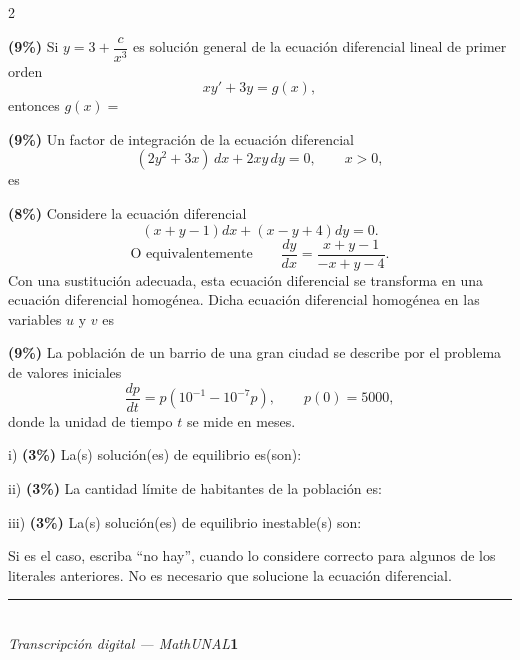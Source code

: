 \documentclass[11pt]{article}
\begin{document}
\begin{multicols}{2}

\begin{opciones}
\item[(a)] \textbf{(9\%)} Si $y=3+\dfrac{c}{x^3}$ es solución general de la ecuación diferencial lineal de primer orden
\[
xy'+3y=g(x),
\]
entonces $g(x)=$ \underline{\hspace{3cm}}

\item[(b)] \textbf{(9\%)} Un factor de integración de la ecuación diferencial
\[
(2y^2+3x)\,dx+2xy\,dy=0, \qquad x>0,
\]
es \underline{\hspace{3cm}}

\columnbreak

\item[(c)] \textbf{(8\%)} Considere la ecuación diferencial
\[
(x+y-1)dx+(x-y+4)dy=0.
\]
\[
\text{O equivalentemente} \qquad \frac{dy}{dx}=\frac{x+y-1}{-x+y-4}.
\]
Con una sustitución adecuada, esta ecuación diferencial se transforma en una ecuación diferencial homogénea. Dicha ecuación diferencial homogénea en las variables $u$ y $v$ es

\underline{\hspace{5cm}}

\item[(d)] \textbf{(9\%)} La población de un barrio de una gran ciudad se describe por el problema de valores iniciales
\[
\frac{dp}{dt}=p(10^{-1}-10^{-7}p), \qquad p(0)=5000,
\]
donde la unidad de tiempo $t$ se mide en meses.

i) \textbf{(3\%)} La(s) solución(es) de equilibrio es(son): \underline{\hspace{2cm}}

ii) \textbf{(3\%)} La cantidad límite de habitantes de la población es: \underline{\hspace{2cm}}

iii) \textbf{(3\%)} La(s) solución(es) de equilibrio inestable(s) son: \underline{\hspace{2cm}}

Si es el caso, escriba ``no hay'', cuando lo considere correcto para algunos de los literales anteriores. No es necesario que solucione la ecuación diferencial.
\end{opciones}

\end{multicols}

\vfill
\rule{\linewidth}{0.4pt}\\[1pt]
{\scriptsize\textit{Transcripción digital --- MathUNAL}\hfill\textcolor{unalblue}{\textbf{1}}}
\end{document}
